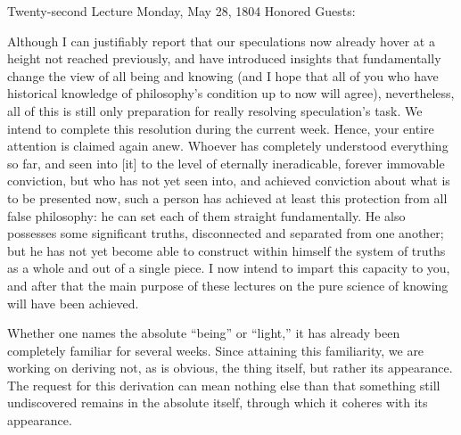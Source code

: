 Twenty-second Lecture
Monday, May 28, 1804
Honored Guests:

Although I can justifiably report that
our speculations now already hover at
a height not reached previously,
and have introduced insights
that fundamentally change the view
of all being and knowing
(and I hope that all of you who have historical knowledge
of philosophy's condition up to now will agree),
nevertheless, all of this is still only preparation
for really resolving speculation's task.
We intend to complete this resolution during the current week.
Hence, your entire attention is claimed again anew.
Whoever has completely understood everything so far,
and seen into [it] to the level of
eternally ineradicable, forever immovable conviction,
but who has not yet seen into,
and achieved conviction about
what is to be presented now,
such a person has achieved at least
this protection from all false philosophy:
he can set each of them straight fundamentally.
He also possesses some significant truths,
disconnected and separated from one another;
but he has not yet become able to construct
within himself the system of truths
as a whole and out of a single piece.
I now intend to impart this capacity to you,
and after that the main purpose of these lectures
on the pure science of knowing will have been achieved.

Whether one names the absolute “being” or “light,”
it has already been completely familiar for several weeks.
Since attaining this familiarity, we are working on
deriving not, as is obvious, the thing itself,
but rather its appearance.
The request for this derivation can mean nothing else than
that something still undiscovered remains in the absolute itself,
through which it coheres with its appearance.

